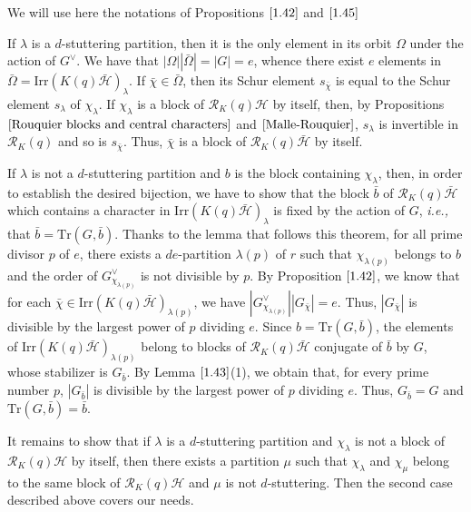 \documentclass[10pt,a4paper,titlepage]{article}
\newcommand{\el}{\lambda}
\newcommand{\ie}{\emph{i.e., }}
\begin{document}
\begin{apod}{We will use here the notations of Propositions $\ref{1.42}$ and $\ref{1.45}$

If $\el$ is a $d$-stuttering partition, then it is the only element in its orbit $\Omega$ under the action of $G^\vee$. We have that $|\Omega||\bar{\Omega}|=|G|=e$, whence there exist $e$ elements in
$\bar{\Omega}= \mathrm{Irr}(K(q)\bar{\mathcal{H}})_\el$. If $\bar{\chi} \in \bar{\Omega}$, then its Schur element $s_{\bar{\chi}}$ is equal to the Schur element $s_\el$ of $\chi_\el$. If $\chi_\el$ is a block of $\mathcal{R}_K(q)\mathcal{H}$ by itself, then, by Propositions $\ref{Rouquier blocks and central characters}$ and
 $\ref{Malle-Rouquier}$, $s_\el$ is invertible in $\mathcal{R}_K(q)$ and so is $s_{\bar{\chi}}$. Thus, $\bar{\chi}$ is a block of $\mathcal{R}_K(q)\bar{\mathcal{H}}$ by itself. 

If $\el$ is not a $d$-stuttering partition and $b$ is the block containing  $\chi_\el$, then, in order to establish the desired bijection, we have to show that the block $\bar{b}$ of $\mathcal{R}_K(q)\bar{\mathcal{H}}$ which contains  a character in $\mathrm{Irr}(K(q)\bar{\mathcal{H}})_\el$ is fixed by the action of $G$, \ie that $\bar{b}=\mathrm{Tr}(G,\bar{b})$. Thanks to the  lemma that follows this theorem, for all prime divisor $p$ of $e$, there exists a
$de$-partition $\el(p)$ of $r$ such that $\chi_{\el(p)}$ belongs to $b$ and  the order of $G^\vee_{\chi_{\el(p)}}$ is not divisible by $p$. By Proposition $\ref{1.42}$, we know that for each $\bar{\chi} \in
\mathrm{Irr}(K(q)\bar{\mathcal{H}})_{\el(p)}$, we have $|G^\vee_{\chi_{\el(p)}}||G_{\bar{\chi}}|=e$. Thus, $|G_{\bar{\chi}}|$ is divisible by the largest power of $p$ dividing $e$.  Since $b=\mathrm{Tr}(G,\bar{b})$,  the elements of $\mathrm{Irr}(K(q)\bar{\mathcal{H}})_{\el(p)}$ belong to blocks of $\mathcal{R}_K(q)\bar{\mathcal{H}}$ conjugate of $\bar{b}$ by $G$, whose stabilizer is $G_{\bar{b}}$. By Lemma $\ref{1.43}$(1), we obtain that, for every prime number $p$,  $|G_{\bar{b}}|$ is divisible by the largest power of $p$ dividing $e$.
Thus, $G_{\bar{b}}=G$ and $\mathrm{Tr}(G,\bar{b})=\bar{b}$.


It remains to show that if $\el$ is a $d$-stuttering partition and $\chi_\el$ is not a block of $\mathcal{R}_K(q)\mathcal{H}$ by itself, then there exists a partition $\mu$ such that $\chi_\el$ and $\chi_{\mu}$ belong to the same block of $\mathcal{R}_K(q)\mathcal{H}$ and $\mu$ is not $d$-stuttering. Then the second case described above covers our needs.

}
\end{apod}
\end{document}
